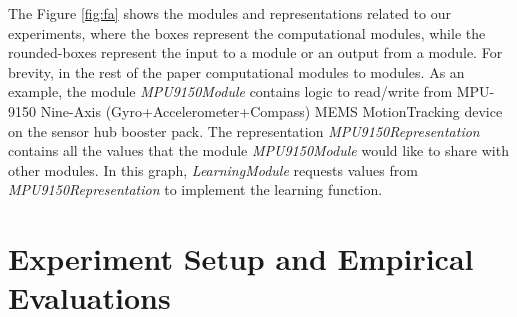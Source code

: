 \documentclass[letterpaper]{article}
\begin{document}
\begin{sloppy}
The Figure \ref{fig:fa} shows the modules and representations related to our 
experiments, where the boxes represent the computational modules, while the rounded-boxes represent 
the input to a module or an output from a module. For brevity, in the rest of the paper 
computational modules to modules. As an example, the module {\em MPU9150Module} contains logic to 
read/write from MPU-9150 Nine-Axis (Gyro+Accelerometer+Compass) MEMS MotionTracking device on the 
sensor hub booster pack. The representation {\em MPU9150Representation} contains all the values that 
the module {\em MPU9150Module} would like to share with other modules. In this graph, {\em 
LearningModule} requests values from {\em MPU9150Representation} to implement the learning function. 
  


\section{Experiment Setup and Empirical Evaluations}


\end{sloppy}
\end{document}
